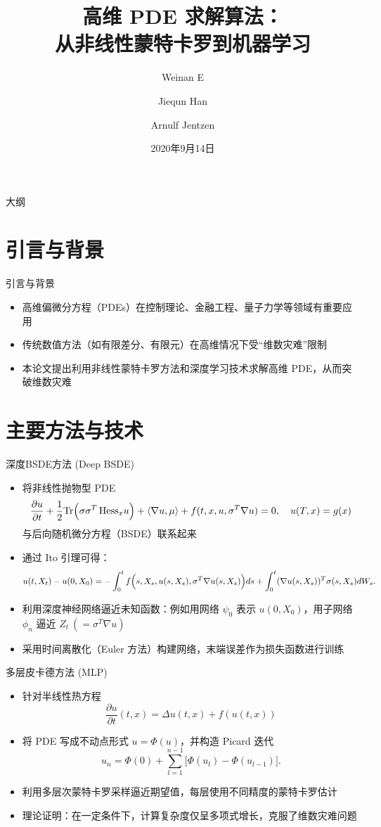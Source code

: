\documentclass[aspectratio=169]{beamer}
\title{高维 PDE 求解算法：\\从非线性蒙特卡罗到机器学习}
\author{Weinan E \and Jiequn Han \and Arnulf Jentzen}
\date{2020年9月14日}
\begin{document}
\begin{frame}
  \titlepage
\end{frame}

\begin{frame}{大纲}
  \tableofcontents
\end{frame}

\section{引言与背景}
\begin{frame}{引言与背景}
  \begin{itemize}
    \item 高维偏微分方程（PDEs）在控制理论、金融工程、量子力学等领域有重要应用
    \item 传统数值方法（如有限差分、有限元）在高维情况下受“维数灾难”限制
    \item 本论文提出利用非线性蒙特卡罗方法和深度学习技术求解高维 PDE，从而突破维数灾难
  \end{itemize}
\end{frame}

\section{主要方法与技术}
\begin{frame}{深度BSDE方法 (Deep BSDE)}
  \begin{itemize}
    \item 将非线性抛物型 PDE
      \[
      \frac{\partial u}{\partial t} + \frac{1}{2}\mathrm{Tr}\Bigl(\sigma\sigma^T\,\mathrm{Hess}_x u\Bigr) + \langle \nabla u, \mu \rangle + f(t,x,u,\sigma^T\nabla u)=0,\quad u(T,x)=g(x)
      \]
      与后向随机微分方程（BSDE）联系起来
    \item 通过 Ito 引理可得：
      \[
      u(t,X_t)-u(0,X_0) = -\int_0^t f\Bigl(s,X_s,u(s,X_s),\sigma^T\nabla u(s,X_s)\Bigr)ds + \int_0^t (\nabla u(s,X_s))^T\sigma(s,X_s)dW_s.
      \]
    \item 利用深度神经网络逼近未知函数：例如用网络 $\psi_0$ 表示 $u(0,X_0)$，用子网络 $\phi_n$ 逼近 $Z_t\ (= \sigma^T\nabla u)$
    \item 采用时间离散化（Euler 方法）构建网络，末端误差作为损失函数进行训练
  \end{itemize}
\end{frame}

\begin{frame}{多层皮卡德方法 (MLP)}
  \begin{itemize}
    \item 针对半线性热方程
      \[
      \frac{\partial u}{\partial t}(t,x)=\Delta u(t,x)+f(u(t,x))
      \]
    \item 将 PDE 写成不动点形式 \(u = \Phi(u)\)，并构造 Picard 迭代
      \[
      u_n = \Phi(0) + \sum_{l=1}^{n-1} \bigl[\Phi(u_l)-\Phi(u_{l-1})\bigr].
      \]
    \item 利用多层次蒙特卡罗采样逼近期望值，每层使用不同精度的蒙特卡罗估计
    \item 理论证明：在一定条件下，计算复杂度仅呈多项式增长，克服了维数灾难问题
  \end{itemize}
\end{frame}
\end{document}
